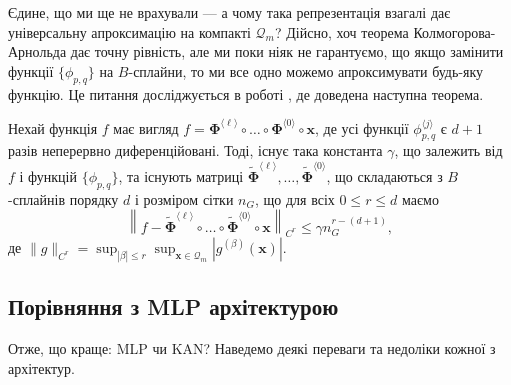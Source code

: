 Єдине, що ми ще не врахували --- а чому така репрезентація взагалі дає універсальну 
апроксимацію на компакті $\mathcal{Q}_m$? Дійсно, хоч теорема Колмогорова-Арнольда
дає точну рівність, але ми поки ніяк не гарантуємо, що якщо замінити функції 
$\{\phi_{p,q}\}$ на $B$-сплайни, то ми все одно можемо апроксимувати будь-яку
функцію. Це питання досліджується в роботі \cite{kan}, де доведена наступна теорема.

\begin{theorem}
	Нехай функція $f$ має вигляд $f = \boldsymbol{\Phi}^{\langle\ell\rangle}
	\circ \dots \circ \boldsymbol{\Phi}^{\langle 0\rangle} \circ \mathbf{x}$, де
	усі функції $\phi_{p,q}^{\langle j \rangle}$ є $d+1$ разів неперервно
	диференційовані. Тоді, існує така константа $\gamma$, що залежить від $f$ і
	функцій $\{\phi_{p,q}\}$, та існують матриці
	$\widetilde{\boldsymbol{\Phi}}^{\langle\ell\rangle},\dots,\widetilde{\boldsymbol{\Phi}}^{\langle
	0\rangle}$, що складаються з $B$-сплайнів порядку $d$ і розміром сітки $n_G$, що
	для всіх $0 \leq r \leq d$ маємо
	\begin{equation*}
		\left\| f - \widetilde{\boldsymbol{\Phi}}^{\langle\ell\rangle}
		\circ \dots \circ \widetilde{\boldsymbol{\Phi}}^{\langle 0\rangle} \circ \mathbf{x} \right\|_{C^r} \leq \gamma n_G^{r-(d+1)},
	\end{equation*}
	де $\|g\|_{C^r} = \sup_{|\beta|\leq r}\sup_{\mathbf{x} \in \mathcal{Q}_m}|g^{(\beta)}(\mathbf{x})|$.
\end{theorem}

\subsection{Порівняння з MLP архітектурою}

Отже, що краще: MLP чи KAN? Наведемо деякі переваги та недоліки кожної з архітектур.

